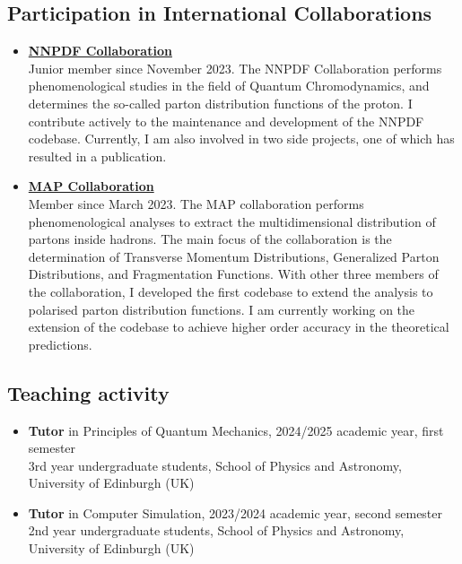 \documentclass[10pt,a4paper]{article}
\begin{document}
\subsection*{Participation in International Collaborations}
\begin{itemize}[leftmargin=1em]
    \item[]
      \textbf{\href{https://nnpdf.mi.infn.it}{NNPDF Collaboration}} \\
      Junior member since November 2023. The NNPDF Collaboration
      performs phenomenological studies in the field of Quantum Chromodynamics, and determines
      the so-called parton distribution functions of the proton. I contribute actively to the
      maintenance and development of the NNPDF codebase. Currently, I am also involved in two
      side projects, one of which has resulted in a publication.
    \item[]
      \textbf{\href{https://github.com/MapCollaboration}{MAP Collaboration}} \\
      Member since March 2023. The MAP collaboration performs phenomenological
      analyses to extract the multidimensional distribution of partons inside hadrons. The main
      focus of the collaboration is the determination of Transverse Momentum Distributions, 
      Generalized Parton Distributions, and Fragmentation Functions. With other three members of the
      collaboration, I developed the first codebase to extend the analysis to polarised parton distribution 
      functions. I am currently working on the extension of the codebase to achieve higher order accuracy
      in the theoretical predictions.
\end{itemize}

\subsection*{Teaching activity}
\begin{itemize}[leftmargin=1em]
    \item[]
    \textbf{Tutor} in Principles of Quantum Mechanics, 2024/2025 academic year, first semester \\
    3rd year undergraduate students, School of Physics and Astronomy, University of Edinburgh (UK)
    \item[]
    \textbf{Tutor} in Computer Simulation, 2023/2024 academic year, second semester \\
    2nd year undergraduate students, School of Physics and Astronomy, University of Edinburgh (UK)
\end{itemize}
\end{document}
